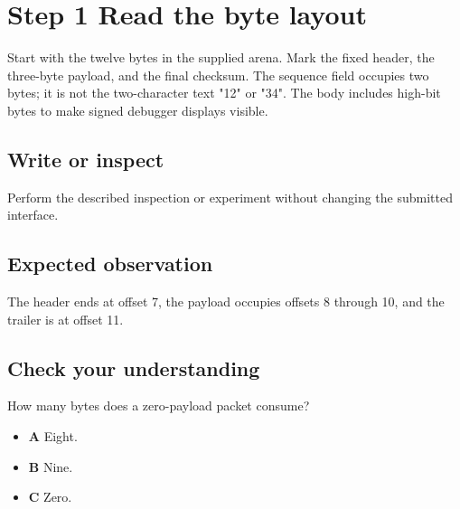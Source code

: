 \section{Step 1 Read the byte layout}\label{packet-s01}

Start with the twelve bytes in the supplied arena. Mark the fixed header, the three-byte payload, and the final checksum. The sequence field occupies two bytes; it is not the two-character text "12" or "34". The body includes high-bit bytes to make signed debugger displays visible.

\subsection{Write or inspect}
Perform the described inspection or experiment without changing the submitted interface.

\subsection{Expected observation}
The header ends at offset 7, the payload occupies offsets 8 through 10, and the trailer is at offset 11.

\subsection{Check your understanding}
How many bytes does a zero-payload packet consume?

\begin{itemize}
  \item \textbf{A} Eight.
  \item \textbf{B} Nine.
  \item \textbf{C} Zero.
\end{itemize}
